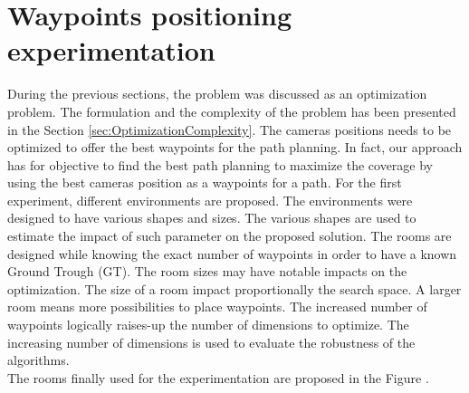 \chapter{Waypoints positioning experimentation} \label{chap:waypointPoseExp}
\minitoc







  During the previous sections, the problem was discussed as an optimization problem. The formulation  and the complexity of the problem has been presented in the Section \ref{sec:OptimizationComplexity}.
  The cameras positions needs to be optimized to offer the best waypoints for the path planning. In fact,  our approach has for objective to find the best path planning to maximize the coverage by using the best cameras position as a waypoints for a path. 
For the first experiment, different environments are proposed. %
The environments were designed to have various shapes and sizes. The various shapes are used to estimate the impact of such parameter on the proposed solution.
The rooms are designed while knowing the exact number of waypoints in order to have a known Ground Trough (GT).
 The room sizes  may have notable impacts on the optimization.
The size of a room impact proportionally the search space. %
A larger room means more possibilities to place waypoints. The increased  number of waypoints logically raises-up the number of dimensions to optimize. %
 The increasing number of dimensions is used to evaluate the robustness of the algorithms.\\
 The rooms finally used for the experimentation are proposed in the Figure .

